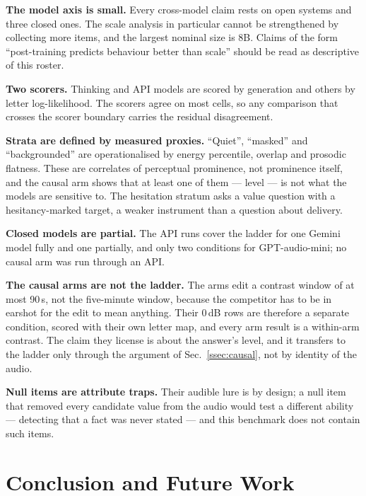 \documentclass{article}
\begin{document}
\textbf{The model axis is small.} Every cross-model claim rests on
\Nmodels{} open systems and three closed ones. The scale analysis in
particular cannot be strengthened by collecting more items, and the largest
nominal size is 8B. Claims of the form ``post-training predicts behaviour
better than scale'' should be read as descriptive of this roster.

\textbf{Two scorers.} Thinking and API models are scored by generation and
others by letter log-likelihood. The scorers agree on most cells, so any
comparison that crosses the scorer boundary carries the residual
disagreement.

\textbf{Strata are defined by measured proxies.} ``Quiet'', ``masked'' and
``backgrounded'' are operationalised by energy percentile, overlap and
prosodic flatness. These are correlates of perceptual prominence, not
prominence itself, and the causal arm shows that at least one of them ---
level --- is not what the models are sensitive to. The hesitation stratum
asks a value question with a hesitancy-marked target, a weaker instrument
than a question about delivery.

\textbf{Closed models are partial.} The API runs cover the ladder for one
Gemini model fully and one partially, and only two conditions for
GPT-audio-mini; no causal arm was run through an API.

\textbf{The causal arms are not the ladder.} The arms edit a contrast
window of at most 90\,s, not the five-minute window, because the competitor
has to be in earshot for the edit to mean anything. Their 0\,dB rows are
therefore a separate condition, scored with their own letter map, and every
arm result is a within-arm contrast. The claim they license is about the
answer's level, and it transfers to the ladder only through the argument of
Sec.~\ref{ssec:causal}, not by identity of the audio.

\textbf{Null items are attribute traps.} Their audible lure is by design;
a null item that removed every candidate value from the audio would test a
different ability --- detecting that a fact was never stated --- and this
benchmark does not contain such items.

\section{Conclusion and Future Work}
\label{sec:conclusion}
\end{document}

